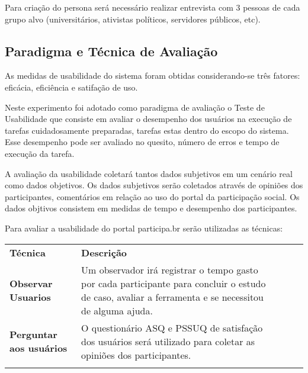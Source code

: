 	Para criação do persona será necessário realizar entrevista com 3 pessoas de cada grupo alvo (universitários, ativistas políticos, servidores públicos, etc).

\subsection{Paradigma e Técnica de Avaliação}

As medidas de usabilidade do sistema foram obtidas considerando-se três fatores: eficácia, eficiência e satifação de uso.

Neste experimento foi adotado como paradigma de avaliação o Teste de Usabilidade que consiste em avaliar o desempenho dos usuários na execução de tarefas cuidadosamente preparadas, tarefas estas dentro do escopo do sistema. Esse desempenho pode ser avaliado no quesito, número de erros e tempo de execução da tarefa.

A avaliação da usabilidade coletará tantos dados subjetivos em um cenário real como dados objetivos. Os dados subjetivos serão coletados através de opiniões dos participantes, comentários em relação ao uso do portal da participação social. Os dados objtivos consistem em medidas de tempo e desempenho dos participantes.

Para avaliar a usabilidade do portal participa.br serão utilizadas as técnicas:


\begin{table}[h]
\begin{tabular}{lllll}
\cline{1-2}
\multicolumn{1}{|l|}{\textbf{Técnica}}                & \multicolumn{1}{l|}{\textbf{Descrição}}                                                                                                                                    &  &  &  \\ \cline{1-2}
\multicolumn{1}{|l|}{\textbf{Observar Usuarios}}      & \multicolumn{1}{l|}{Um observador irá registrar o tempo gasto por cada participante para concluir o estudo de caso, avaliar a ferramenta e se necessitou de alguma ajuda.} &  &  &  \\ \cline{1-2}
\multicolumn{1}{|l|}{\textbf{Perguntar aos usuários}} & \multicolumn{1}{l|}{O questionário ASQ e PSSUQ de satisfação dos usuários será utilizado para coletar as opiniões dos participantes.}                                      &  &  &  \\ \cline{1-2}
                                                      &                                                                                                                                                                            &  &  & 
\end{tabular}
\end{table}



